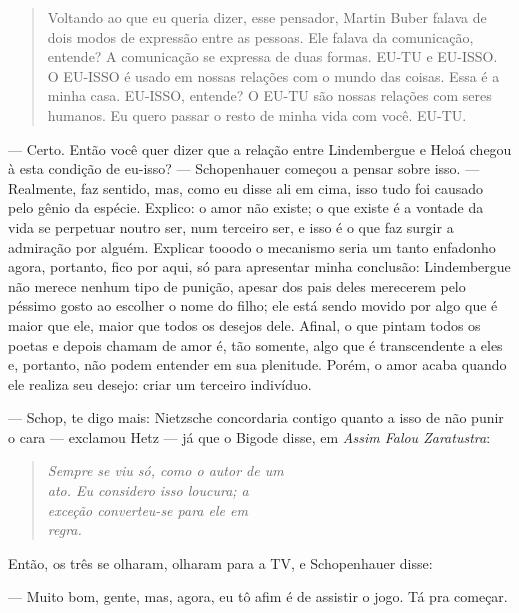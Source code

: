 \begin{quotation}
Voltando ao que eu queria dizer, esse pensador, Martin Buber falava de dois modos de expressão entre as pessoas. Ele falava da comunicação, entende? A comunicação se expressa de duas formas. EU-TU e EU-ISSO. O EU-ISSO é usado em nossas relações com o mundo das coisas. Essa é a minha casa. EU-ISSO, entende? O EU-TU são nossas relações com seres humanos. Eu quero passar o resto de minha vida com você. EU-TU.
\end{quotation}

--- Certo. Então você quer dizer que a relação entre Lindembergue e Heloá chegou à esta condição de eu-isso? --- Schopenhauer começou a pensar sobre isso. --- Realmente, faz sentido, mas, como eu disse ali em cima, isso tudo foi causado pelo gênio da espécie. Explico: o amor não existe; o que existe é a vontade da vida se perpetuar noutro ser, num terceiro ser, e isso é o que faz surgir a admiração por alguém. Explicar tooodo o mecanismo seria um tanto enfadonho agora, portanto, fico por aqui, só para apresentar minha conclusão: Lindembergue não merece nenhum tipo de punição, apesar dos pais deles merecerem pelo péssimo gosto ao escolher o nome do filho; ele está sendo movido por algo que é maior que ele, maior que todos os desejos dele. Afinal, o que pintam todos os poetas e depois chamam de amor é, tão somente, algo que é transcendente a eles e, portanto, não podem entender em sua plenitude. Porém, o amor acaba quando ele realiza seu desejo: criar um terceiro indivíduo.

\begin{sloppypar}
--- Schop, te digo mais: Nietzsche concordaria contigo quanto a isso de não punir o cara --- exclamou Hetz --- já que o Bigode disse, em \emph{Assim Falou Zaratustra}:
\end{sloppypar}

\begin{verse}
\emph{
Sempre se viu só, como o autor de um \\
ato. Eu considero isso loucura; a \\
exceção converteu-se para ele em \\
regra. \\
}
\end{verse}

Então, os três se olharam, olharam para a TV, e Schopenhauer disse:

--- Muito bom, gente, mas, agora, eu tô afim é de assistir o jogo. Tá pra começar.
